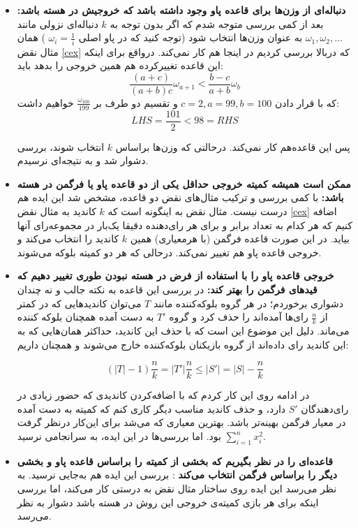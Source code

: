 \documentclass[12pt]{article}
\begin{document}
\begin{itemize}
    \item \textbf{دنباله‌ای از وزن‌ها برای قاعده پاو وجود داشته باشد که خروجیش در هسته باشد:}
    بعد از کمی بررسی متوجه شدم که اگر بدون توجه به $k$
     دنباله‌ای نزولی مانند
    $\omega_1, \omega_2, \dots$
    به عنوان وزن‌ها انتخاب شود (توجه کنید که در پاو اصلی 
    $\omega_i =\frac{1}{i}$
    )
    همان مثال نقض 
    \autoref{cex}
    که دربالا بررسی کردیم در اینجا هم کار نمی‌کند. درواقع 
    برای اینکه این قاعده تغییرکرده هم همین خروجی را بدهد باید:
    \[
    \frac{(a+c)}{(a+b)c} \omega_{a+1} < \frac{b-c}{a+b} \omega_b
    \]
    که با قرار دادن
    $c=2, a=99, b=100$
    و تقسیم دو طرف بر
    $\frac{\omega_{100}}{199}$
    خواهیم داشت:
    \[
    LHS  = \frac{101}{2} < 98 = RHS
    \]

    پس این قاعده‌هم کار نمی‌کند. درحالتی که وزن‌ها براساس $k$
    انتخاب شوند، بررسی دشوار شد و به نتیجه‌ای نرسیدم.
    \item
    \textbf{
        ممکن است همیشه کمیته‌ خروجی حداقل یکی از دو قاعده پاو یا فرگمن در هسته باشد:}
        با کمی بررسی و ترکیب مثال‌های نقض دو قاعده، مشخص شد این ایده
        هم درست نیست. مثال نقض به اینگونه است که $k$
        کاندید به مثال نقض 
        \autoref{cex}
        اضافه کنیم که هر کدام به تعداد برابر و برای هر رای‌دهنده دقیقا یک‌بار
        در مجموعه‌رای آنها بیاید. در این صورت قاعده فرگمن (با هرمعیاری)
        همین $k$
        کاندید را انتخاب می‌کند و خروجی قاعده پاو هم تغییر نمی‌کند. درحالی که هر
        دو کمیته بلوکه می‌شوند.
    \item \textbf{
        خروجی قاعده پاو را با استفاده از فرض در هسته نبودن طوری تغییر دهیم که قیدهای فرگمن را بهتر کند:}
در بررسی این قاعده به نکته جالب و نه چندان دشواری برخوردم؛ در هر گروه بلوکه‌کننده
مانند $T$ 
می‌توان کاندیدهایی که در کمتر از $\frac{n}{k}$
رای‌ها آمده‌اند را حذف کرد و گروه $T'$
به دست آمده همچنان بلوکه کننده می‌ماند. دلیل این موضوع این است که  
با حذف این کاندید، حداکثر همان‌هایی که به این کاندید رای‌‌ داده‌اند
از گروه بازیکنان بلوکه‌کننده خارج می‌شوند و همچنان داریم:

\[
\left(\left|T\right| - 1 \right) \frac{n}{k} = \left|T'\right| \frac{n}{k} \le \left|S'\right| = \left|S\right| - \frac{n}{k}
\]

در ادامه روی این کار کردم که با اضافه‌کردن کاندیدی که حضور زیادی در 
رای‌دهندگان $S'$
دارد، و حذف کاندید مناسب دیگر کاری کنم که کمیته به دست آمده در معیار فرگمن
بهینه‌تر باشد. بهترین معیاری که می‌شد برای این‌کار درنظر گرفت
$\sum_{i = 1}^{n} x_i ^2$
بود. اما بررسی‌ها در این ایده، به سرانجامی نرسید.

    \item
    \textbf{
        قاعده‌ای را در نظر بگیریم که بخشی از کمیته را براساس قاعده پاو و بخشی دیگر را براساس فرگمن انتخاب می‌کند
        }:
        بررسی این ایده هم به‌جایی نرسید. به نظر می‌رسد این ایده روی ساختار مثال نقض به درستی کار می‌کند،
        اما بررسی اینکه برای هر بازی کمیته‌ی خروجی این روش در هسته باشد دشوار به نظر می‌رسد.

\end{itemize}
\end{document}
